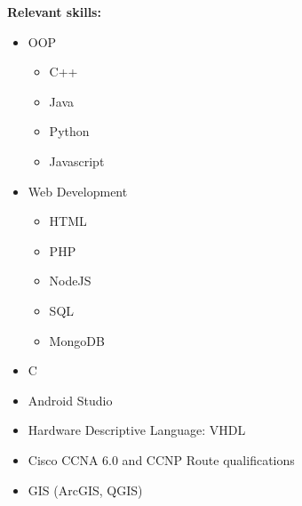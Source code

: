 \documentclass[12pt,a4paper]{article}
\begin{document}
		\parbox{\textwidth}{
			\textbf{\small Relevant skills:}\\
			\parbox{5cm}{
				\begin{itemize}\itemsep0em
					\item OOP
					\begin {itemize}\itemsep0em
						\item C++
						\item Java
						\item Python
						\item Javascript
					\end {itemize}
				\end {itemize}
			} 
			\parbox{5cm}{
				\begin{itemize}\itemsep0em	
					\item Web Development
					\begin {itemize}\itemsep0em
						\item HTML
						\item PHP
						\item NodeJS
						\item SQL
						\item MongoDB
					\end {itemize}
				\end {itemize}
			}
			\begin{itemize}\itemsep0em	
				\item C
				\item Android Studio
				\item Hardware Descriptive Language: VHDL
				\item Cisco CCNA 6.0 and CCNP Route qualifications
				\item GIS (ArcGIS, QGIS)
			\end{itemize}
		}
		
\end{document}
